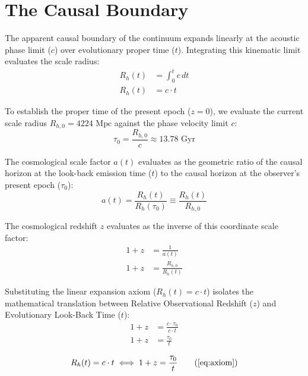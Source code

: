 \section{The Causal Boundary}
\label{sec:deriv_axiom}
The apparent causal boundary of the continuum expands linearly at the acoustic phase limit ($c$) over evolutionary proper time ($t$). Integrating this kinematic limit evaluates the scale radius: 
\begin{align}
    R_h(t) &= \int_{0}^{t} c \, dt \\
    R_h(t) &= c \cdot t
\end{align}

To establish the proper time of the present epoch ($z=0$), we evaluate the current scale radius $R_{h,0} = 4224 \text{ Mpc}$ against the phase velocity limit $c$: 
\begin{equation}
    \tau_0 = \frac{R_{h,0}}{c} \approx 13.78 \text{ Gyr}
\end{equation}

The cosmological scale factor $a(t)$ evaluates as the geometric ratio of the causal horizon at the look-back emission time ($t$) to the causal horizon at the observer's present epoch ($\tau_0$): 
\begin{equation}
    a(t) = \frac{R_h(t)}{R_{h}(\tau_0)} \equiv \frac{R_h(t)}{R_{h,0}}
\end{equation}

The cosmological redshift $z$ evaluates as the inverse of this coordinate scale factor: 
\begin{align}
    1 + z &= \frac{1}{a(t)} \\
    1 + z &= \frac{R_{h,0}}{R_h(t)}
\end{align}

Substituting the linear expansion axiom ($R_h(t) = c \cdot t$) isolates the mathematical translation between Relative Observational Redshift ($z$) and Evolutionary Look-Back Time ($t$): 
\begin{align}
    1 + z &= \frac{c \cdot \tau_0}{c \cdot t} \\
    1+z &= \frac{\tau_0}{t}
\end{align}

\begin{tcolorbox}[recallbox, title={\ref{box:axiom}. The Causal Boundary}]
\begin{equation}
    R_h(t) = c \cdot t \iff 1+z = \frac{\tau_0}{t} \tag{\ref{eq:axiom}}
\end{equation}
\end{tcolorbox}

